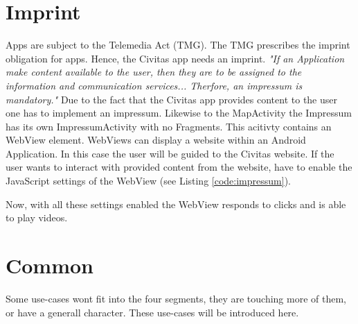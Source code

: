 

\section{Imprint}
Apps are subject to the Telemedia Act (TMG). The TMG prescribes the imprint obligation for apps. Hence, the Civitas app needs an imprint. \textit{"If an Application make content available to the user, then they are to be assigned to the information and communication services... Therfore, an impressum is mandatory."} \cite{impressum}
Due to the fact that the Civitas app provides content to the user one has to implement an impressum. 
Likewise to the MapActivity the Impressum has its own ImpressumActivity with no Fragments. This acitivty contains an WebView element. WebViews can display a website within an Android Application. In this case the user will be guided to the Civitas website. If the user wants to interact with provided content from the website, have to enable the JavaScript settings of the WebView (see Listing \ref{code:impressum}).

\fbox{

}

Now, with all these settings enabled the WebView responds to clicks and is able to play videos.



\section{Common}
Some use-cases wont fit into the four segments, they are touching more of them, or have a generall character. These use-cases will be introduced here.

